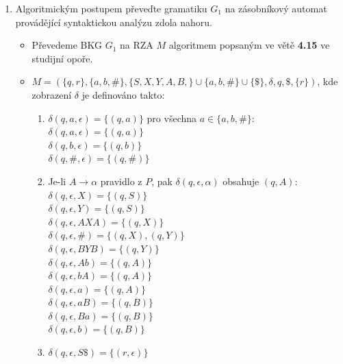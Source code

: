 \documentclass[a4paper,11pt]{article}[24.3.2010]
\begin{document}
\begin{enumerate}
\begin{enumerate}
    \item Algoritmickým postupem převeďte gramatiku $G_{1}$ na zásobníkový automat provádějící syntaktickou analýzu zdola nahoru.\\
    \begin{itemize}
    \item Převedeme BKG $G_{1}$ na RZA $M$ algoritmem popsaným ve větě \textbf{4.15} ve studijní opoře.\\
    \item $M=(\{q,r\},\{a,b,\#\},\{S,X,Y,A,B,\} \cup \{a,b,\#\} \cup \{\$\} ,\delta,q,\$,\{r\})$, kde
    zobrazení $\delta$ je definováno takto:\\
    \begin{enumerate}
    \item $\delta(q,a,\epsilon)=\{(q,a)\}$ pro všechna $a \in \{a,b,\#\}$:\\
    $\delta(q,a,\epsilon)=\{(q,a)\}$\\
    $\delta(q,b,\epsilon)=\{(q,b)\}$\\
    $\delta(q,\#,\epsilon)=\{(q,\#)\}$\\
    \item Je-li $A \rightarrow \alpha$ pravidlo z $P$, pak $\delta(q,\epsilon,\alpha)$ obsahuje $(q,A)$:\\
    $\delta(q,\epsilon,X)=\{(q,S)\}$\\
    $\delta(q,\epsilon,Y)=\{(q,S)\}$\\
    $\delta(q,\epsilon,AXA)=\{(q,X)\}$\\
    $\delta(q,\epsilon,\#)=\{(q,X),(q,Y)\}$\\
    $\delta(q,\epsilon,BYB)=\{(q,Y)\}$\\
    $\delta(q,\epsilon,Ab)=\{(q,A)\}$\\
    $\delta(q,\epsilon,bA)=\{(q,A)\}$\\
    $\delta(q,\epsilon,a)=\{(q,A)\}$\\
    $\delta(q,\epsilon,aB)=\{(q,B)\}$\\
    $\delta(q,\epsilon,Ba)=\{(q,B)\}$\\
    $\delta(q,\epsilon,b)=\{(q,B)\}$\\
    \item $\delta(q,\epsilon,S\$)=\{(r,\epsilon)\}$\\
    \end{enumerate}
    \end{itemize}


\end{enumerate}
\end{enumerate}
\end{document}
